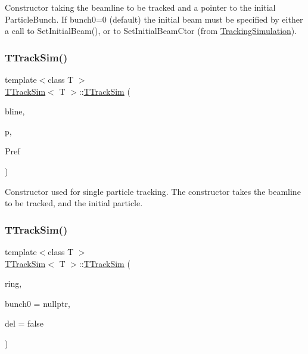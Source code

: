 Constructor taking the beamline to be tracked and a pointer to the initial Particle\+Bunch. If bunch0=0 (default) the initial beam must be specified by either a call to Set\+Initial\+Beam(), or to Set\+Initial\+Beam\+Ctor (from \hyperlink{classTrackingSimulation}{Tracking\+Simulation}). \mbox{\label{classTTrackSim_a49d104506d708be8efaa915a6d90070a}} 
\subsubsection{\texorpdfstring{T\+Track\+Sim()}{TTrackSim()}\hspace{0.1cm}{\footnotesize\ttfamily [2/5]}}
{\footnotesize\ttfamily template$<$class T $>$ \\
\hyperlink{classTTrackSim}{T\+Track\+Sim}$<$ T $>$\+::\hyperlink{classTTrackSim}{T\+Track\+Sim} (\begin{DoxyParamCaption}\item[{const \hyperlink{classAcceleratorModel_1_1Beamline}{Accelerator\+Model\+::\+Beamline} \&}]{bline,  }\item[{const particle\+\_\+type \&}]{p,  }\item[{double}]{Pref }\end{DoxyParamCaption})}

Constructor used for single particle tracking. The constructor takes the beamline to be tracked, and the initial particle. \mbox{\label{classTTrackSim_a3449b7c0ac9a0bc9aa5bc462cb2096bb}} 
\subsubsection{\texorpdfstring{T\+Track\+Sim()}{TTrackSim()}\hspace{0.1cm}{\footnotesize\ttfamily [3/5]}}
{\footnotesize\ttfamily template$<$class T $>$ \\
\hyperlink{classTTrackSim}{T\+Track\+Sim}$<$ T $>$\+::\hyperlink{classTTrackSim}{T\+Track\+Sim} (\begin{DoxyParamCaption}\item[{const \hyperlink{classring__iterator}{Accelerator\+Model\+::\+Ring\+Iterator} \&}]{ring,  }\item[{bunch\+\_\+type $\ast$}]{bunch0 = {\ttfamily nullptr},  }\item[{bool}]{del = {\ttfamily false} }\end{DoxyParamCaption})\hspace{0.3cm}{\ttfamily [explicit]}}

